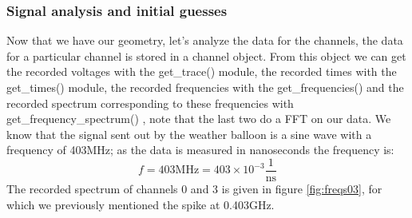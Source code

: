 \subsubsection{Signal analysis and initial guesses}
Now that we have our geometry, let's analyze the data for the channels,
the data for a particular channel is stored in a channel object. From this
object we can get the recorded voltages with the get\_trace() module, the
recorded times with the get\_times() module, the recorded frequencies with the
get\_frequencies() and the recorded spectrum corresponding to these frequencies
with get\_frequency\_spectrum() , note that the last two do a FFT on our data.
We know that the signal sent out by the weather balloon is a sine wave with a
frequency of 403MHz; as the data is measured in nanoseconds the frequency is:
\begin{equation}
	f = 403\text{MHz} = 403\times 10^{-3} \frac{1}{\text{ns}}
\end{equation}
The recorded spectrum of channels 0 and 3 is given in figure \ref{fig:freqs03}, for 
which we previously mentioned the spike at 0.403GHz.
